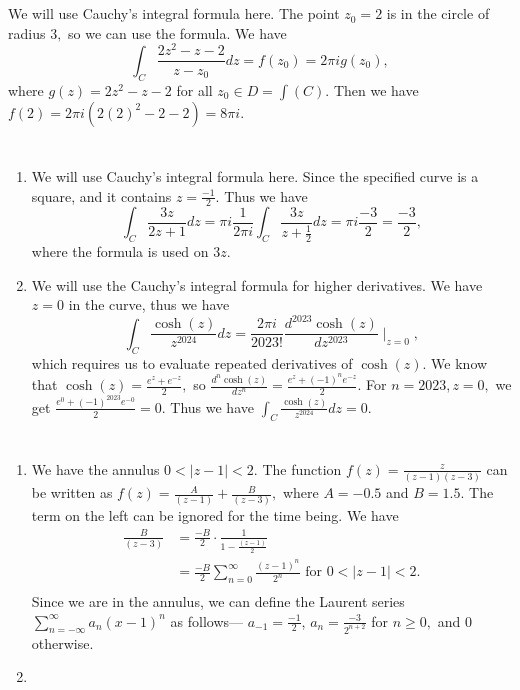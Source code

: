 \documentclass{article}
\title{} %
\author{Gandhar Kulkarni (mmat2304)} %
\date{} %
\begin{document}
\maketitle %


\section{} %
We will use Cauchy's integral formula here. The point $z_0=2$ is in the circle of radius $3,$ so we can use the formula. We have $$\int_C 
\frac{2z^2-z-2}{z-z_0}dz= f(z_0)=2 \pi i g(z_0),$$ where $g(z)=2z^2-z-2$ for all $z_0 \in D= \int(C).$ Then we have $f(2)=2 \pi i (2(2)^2-2-2)=8\pi i.$    
\section{} %
\begin{enumerate}
	\item We will use Cauchy's integral formula here. Since the specified curve is a square, and it contains $z=\frac{-1}{2}.$ 
	Thus we have $$\int_C \frac{3z}{2z+1}dz =\pi i \frac{1}{2 \pi i}\int_C \frac{3z}{z+\frac{1}{2}}dz= \pi i \frac{-3}{2}=\frac{-3}{2},$$ where the formula 
	is used on $3z.$
	\item We will use the Cauchy's integral formula for higher derivatives. We have $z=0$ in the curve, thus we have 
	$$ \int_C \frac{\cosh (z)}{z^{2024}}dz =\frac{2 \pi i}{2023!}\frac{d^{2023}\cosh(z)}{dz^{2023}} \mid_{z=0},$$
	which requires us to evaluate repeated derivatives of $\cosh(z).$ We know that $\cosh(z)= \frac{e^z + e^{-z}}{2},$ 
	so $\frac{d^n \cosh(z)}{dz^{n}}= \frac{e^z + (-1)^n e^{-z}}{2}.$ For $n=2023, z=0,$ we get 
	$ \frac{e^{0}+ (-1)^{2023}e^{-0}}{2}=0.$ Thus we have $\int_C \frac{\cosh (z)}{z^{2024}}dz=0.$
\end{enumerate}
\section{} %
\begin{enumerate}
	\item We have the annulus $ 0< |z-1|< 2.$ The function $f(z)=\frac{z}{(z-1)(z-3)}$ can be written as $f(z)=\frac{A}{(z-1)}+ \frac{B}{(z-3)},$ where 
	$A=-0.5$ and $B=1.5.$ The term on the left can be ignored for the time being. We have 
	\begin{align*}
		\frac{B}{(z-3)} &= \frac{-B}{2} \cdot \frac{1}{1- \frac{(z-1)}{2}}\\
		&= \frac{-B}{2} \sum_{n=0}^{\infty} \frac{(z-1)^n}{2^n} \text{ for $0 < |z-1| < 2.$}\\
	\end{align*}
Since we are in the annulus, we can define the Laurent series $\sum_{n=-\infty}^{\infty}a_n(x-1)^n$ as follows--- $a_{-1}= \frac{-1}{2}$, 
$a_n=\frac{-3}{2^{n+2}}$ for $n \geq 0,$ and $0$ otherwise. 
\item 
\end{enumerate}
\end{document}

